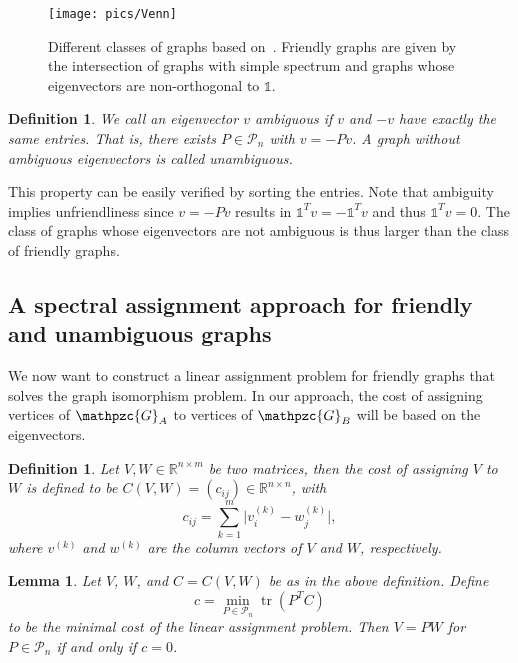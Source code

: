 \documentclass
[
    a4paper,
    DIV=11,
    abstracton
]
{scrartcl}
\newcommand{\R}{\mathbb{R}}
\newcommand{\mc}[1]{\mathpzc{#1}}
\DeclareMathOperator{\tr}{tr}
\newtheorem{lemma}[theorem]{Lemma}
\newtheorem{definition}[theorem]{Definition}
\theoremstyle{definition}
\begin{document}
\begin{figure}[htb]
    \centering
    \texttt{[image: pics/Venn]}
    \caption{Different classes of graphs based on~\cite{FS15}. Friendly graphs are given by the intersection of graphs with simple spectrum and graphs whose eigenvectors are non-orthogonal to $ \mathds{1}$.}
    \label{fig:Venn}
\end{figure}

\begin{definition}
We call an eigenvector $ v $ \emph{ambiguous} if $ v $ and $ -v $ have exactly the same entries. That is, there exists $ P \in \mathcal{P}_n $ with $ v = -P v $. A graph without ambiguous eigenvectors is called \emph{unambiguous}.
\end{definition}

This property can be easily verified by sorting the entries. Note that ambiguity implies unfriendliness since $ v = -P v $ results in $ \mathds{1}^T v = -\mathds{1}^T v $ and thus $ \mathds{1}^T v = 0 $. The class of graphs whose eigenvectors are not ambiguous is thus larger than the class of friendly graphs.

\subsection{A spectral assignment approach for friendly and unambiguous graphs}

We now want to construct a linear assignment problem for friendly graphs that solves the graph isomorphism problem. In our approach, the cost of assigning vertices of $ \mc{G}_A $ to vertices of $ \mc{G}_B $ will be based on the eigenvectors.

\begin{definition} \label{def:Cost matrix}
Let $ V, W \in \R^{n \times m} $ be two matrices, then the cost of assigning $ V $ to $ W $ is defined to be $ C(V, W) = (c_{ij}) \in \R^{n \times n} $, with 
\begin{equation*}
    c_{ij} = \sum_{k=1}^m \big\lvert v_i^{(k)} - w_j^{(k)} \big\rvert,
\end{equation*}
where $ v^{(k)} $ and $ w^{(k)} $ are the column vectors of $ V $ and $ W $, respectively.
\end{definition}

\begin{lemma} \label{lem:PermVecMat}
Let $ V $, $ W $, and $ C = C(V, W) $ be as in the above definition. Define
\begin{equation} \label{eq:LAP}
    c = \min_{P \in \mathcal{P}_n} \tr \left( P^T C \right)
\end{equation}
to be the minimal cost of the linear assignment problem. Then $ V = P W $ for $ P \in \mathcal{P}_n $ if and only if $ c = 0 $.
\end{lemma}
\end{document}
